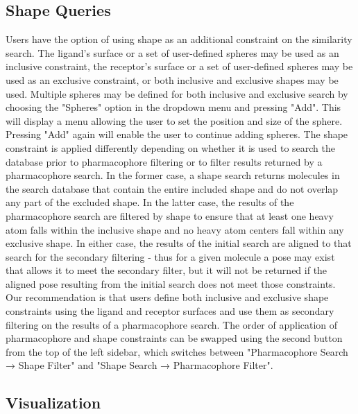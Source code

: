 \subsection{Shape Queries}

\cite{matchpack}\cite{vams}
Users have the option of using shape as an additional constraint on the similarity search. The ligand's surface or a set of user-defined spheres may be used as an inclusive constraint, the receptor's surface or a set of user-defined spheres may be used as an exclusive constraint, or both inclusive and exclusive shapes may be used. Multiple spheres may be defined for both inclusive and exclusive search by choosing the "Spheres" option in the dropdown menu and pressing "Add". This will display a menu allowing the user to set the position and size of the sphere. Pressing "Add" again will enable the user to continue adding spheres. The shape constraint is applied differently depending on whether it is used to search the database prior to pharmacophore filtering or to filter results returned by a pharmacophore search. In the former case, a shape search returns molecules in the search database that contain the entire included shape and do not overlap any part of the excluded shape. In the latter case, the results of the pharmacophore search are filtered by shape to ensure that at least one heavy atom falls within the inclusive shape and no heavy atom centers fall within any exclusive shape. In either case, the results of the initial search are aligned to that search for the secondary filtering - thus for a given molecule a pose may exist that allows it to meet the secondary filter, but it will not be returned if the aligned pose resulting from the initial search does not meet those constraints. Our recommendation is that users define both inclusive and exclusive shape constraints using the ligand and receptor surfaces and use them as secondary filtering on the results of a pharmacophore search. The order of application of pharmacophore and shape constraints can be swapped using the second button from the top of the left sidebar, which switches between "Pharmacophore Search → Shape Filter" and "Shape Search → Pharmacophore Filter".

\subsection{Visualization}

